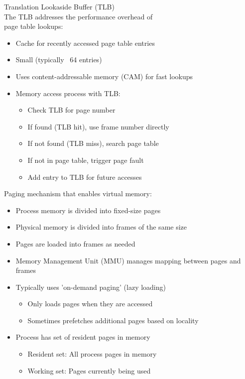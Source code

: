 \begin{theorem}{Translation Lookaside Buffer (TLB)}\\
    The TLB addresses the performance overhead of \\ page table lookups:
    \begin{itemize}
        \item Cache for recently accessed page table entries
        \item Small (typically ~64 entries)
        \item Uses content-addressable memory (CAM) for fast lookups
        \item Memory access process with TLB:
            \begin{itemize}
                \item Check TLB for page number
                \item If found (TLB hit), use frame number directly
                \item If not found (TLB miss), search page table
                \item If not in page table, trigger page fault
                \item Add entry to TLB for future accesses
            \end{itemize}
    \end{itemize}
\end{theorem}

\begin{definition}{Paging} mechanism that enables virtual memory:
    \begin{itemize}
        \item Process memory is divided into fixed-size pages
        \item Physical memory is divided into frames of the same size
        \item Pages are loaded into frames as needed
        \item Memory Management Unit (MMU) manages mapping between pages and frames
        \item Typically uses 'on-demand paging' (lazy loading)
            \begin{itemize}
                \item Only loads pages when they are accessed
                \item Sometimes prefetches additional pages based on locality
            \end{itemize}
        \item Process has set of resident pages in memory
            \begin{itemize}
                \item Resident set: All process pages in memory
                \item Working set: Pages currently being used
            \end{itemize}
    \end{itemize}
\end{definition}

